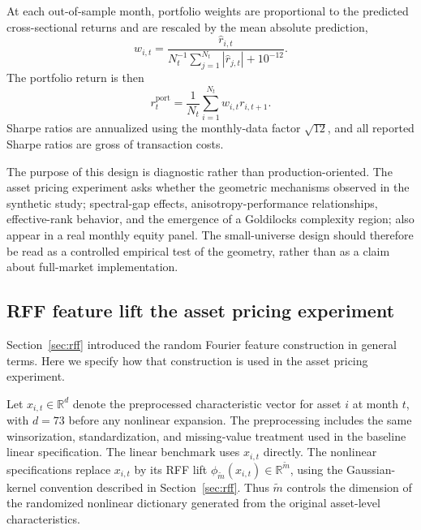 \documentclass[11pt,letterpaper]{article}
\newcommand{\bR}{\mathbb{R}}
\begin{document}
At each out-of-sample month, portfolio weights are proportional to the
predicted cross-sectional returns and are rescaled by the mean absolute
prediction,
\begin{equation*}
w_{i,t}
=
\frac{\hat r_{i,t}}
{N_t^{-1}\sum_{j=1}^{N_t}|\hat r_{j,t}|+10^{-12}} .
\end{equation*}
The portfolio return is then
\begin{equation*}
r_t^{\mathrm{port}}
=
\frac{1}{N_t}\sum_{i=1}^{N_t} w_{i,t} r_{i,t+1}.
\end{equation*}
Sharpe ratios are annualized using the monthly-data factor $\sqrt{12}$, and
all reported Sharpe ratios are gross of transaction costs.

The purpose of this design is diagnostic rather than production-oriented. The
asset pricing experiment asks whether the geometric mechanisms observed in the
synthetic study; spectral-gap effects, anisotropy-performance relationships,
effective-rank behavior, and the emergence of a Goldilocks complexity
region; also appear in a real monthly equity panel. The small-universe design should therefore be
read as a controlled empirical test of the geometry, rather than as a claim
about full-market implementation.

\subsection{RFF feature lift the asset pricing experiment}
\label{sec:hist:rff}

Section~\ref{sec:rff} introduced the random Fourier feature construction in
general terms. Here we specify how that construction is used in the asset pricing  experiment.

Let $x_{i,t}\in \bR^d$ denote the preprocessed characteristic vector for asset $i$ at month $t$,
with $d=73$ before any nonlinear expansion. The preprocessing includes the
same winsorization, standardization, and missing-value treatment used in the
baseline linear specification. The linear benchmark uses $x_{i,t}$ directly.
The nonlinear specifications replace $x_{i,t}$ by its RFF lift $\phi_{\tilde m}(x_{i,t})\in \bR^{\tilde m}$,
using the Gaussian-kernel convention described in Section~\ref{sec:rff}. Thus $\tilde m$ controls the dimension of the randomized
nonlinear dictionary generated from the original asset-level characteristics.
\end{document}
